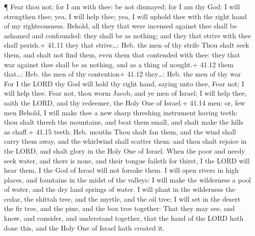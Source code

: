  ¶ Fear thou not; for I am with thee: be not dismayed; for
I am thy God: I will strengthen thee; yea, I will help thee; yea, I will
uphold thee with the right hand of my righteousness. 
Behold, all they that were incensed against thee shall be ashamed and
confounded: they shall be as nothing; and they that strive with thee
shall perish.+ 41.11 they that strive\ldots: Heb. the men of thy strife
 Thou shalt seek them, and shalt not find them, even them
that contended with thee: they that war against thee shall be as
nothing, and as a thing of nought.+ 41.12 them that\ldots: Heb. the men
of thy contention+ 41.12 they\ldots: Heb. the men of thy war
 For I the LORD thy God will hold thy right hand, saying
unto thee, Fear not; I will help thee.  Fear not, thou worm
Jacob, and ye men of Israel; I will help thee, saith the LORD, and thy
redeemer, the Holy One of Israel.+ 41.14 men: or, few men 
Behold, I will make thee a new sharp threshing instrument having teeth:
thou shalt thresh the mountains, and beat them small, and shalt make the
hills as chaff.+ 41.15 teeth: Heb. mouths  Thou shalt fan
them, and the wind shall carry them away, and the whirlwind shall
scatter them: and thou shalt rejoice in the LORD, and shalt glory in the
Holy One of Israel.  When the poor and needy seek water,
and there is none, and their tongue faileth for thirst, I the LORD will
hear them, I the God of Israel will not forsake them.  I
will open rivers in high places, and fountains in the midst of the
valleys: I will make the wilderness a pool of water, and the dry land
springs of water.  I will plant in the wilderness the
cedar, the shittah tree, and the myrtle, and the oil tree; I will set in
the desert the fir tree, and the pine, and the box tree together:
 That they may see, and know, and consider, and understand
together, that the hand of the LORD hath done this, and the Holy One of
Israel hath created it.

